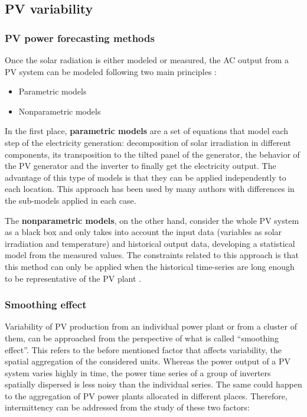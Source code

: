 \subsection{PV variability}
\subsubsection{PV power forecasting methods}

Once the solar radiation is either modeled or measured, the AC output from a PV system can be modeled following two main principles \cite*{Almeida2015}:

\begin{itemize}
\item Parametric models
\item Nonparametric models
\end{itemize}

In the first place, \textbf{parametric models} are a set of equations that model each step of the electricity generation: decomposition of solar irradiation in different components, its transposition to the tilted panel of the generator, the behavior of the PV generator and the inverter to finally get the electricity output. The advantage of this type of models is that they can be applied independently to each location. This approach has been used by many authors \cite*{Bofinger2006, Lorenz2008, Lorenz2011} with differences in the sub-models applied in each case.

The \textbf{nonparametric models}, on the other hand, consider the whole PV system as a black box and only takes into account the input data (variables as solar irradiation and temperature) and historical output data, developing a statistical model from the measured values. The constraints related to this approach is that this method can only be applied when the historical time-series are long enough to be representative of the PV plant \cite*{bacher2009online}.

\subsubsection{Smoothing effect}

Variability of PV production from an individual power plant or from a cluster of them, can be approached from the perspective of what is called ``smoothing effect''. This refers to the before mentioned factor that affects variability, the spatial aggregation of the considered units. Whereas the power output of a PV system varies highly in time, the power time series of a group of inverters spatially dispersed is less noisy than the individual series. The same could happen to the aggregation of PV power plants allocated in different places. Therefore, intermittency can be addressed from the study of these two factors:


